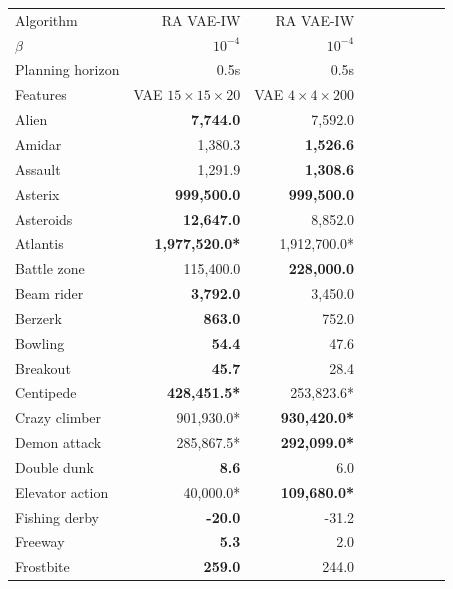 \begin{table}[ht]
\begin{center}
\begin{small}
\begin{tabular}{lrrrrrrrl}

\toprule
Algorithm& RA VAE-IW & RA VAE-IW \\
    $\beta$ & $10^{-4}$ & $10^{-4}$\\
Planning horizon&  0.5s & 0.5s \\
Features &   VAE $15 \times 15 \times 20$ &  VAE $4 \times 4 \times 200$ \\
\midrule
Alien           & \textbf{7,744.0}     & 7,592.0              \\
Amidar          & 1,380.3              & \textbf{1,526.6}     \\
Assault         & 1,291.9              & \textbf{1,308.6}     \\
Asterix         & \textbf{999,500.0}   & \textbf{999,500.0}   \\
Asteroids       & \textbf{12,647.0}    & 8,852.0              \\
Atlantis        & \textbf{1,977,520.0*} & 1,912,700.0*          \\
Battle zone     & 115,400.0            & \textbf{228,000.0}   \\
Beam rider      & \textbf{3,792.0}     & 3,450.0              \\
Berzerk         & \textbf{863.0}       & 752.0                \\
Bowling         & \textbf{54.4}        & 47.6                 \\
Breakout        & \textbf{45.7}        & 28.4                 \\
Centipede       & \textbf{428,451.5*}   & 253,823.6*            \\
Crazy climber   & 901,930.0*            & \textbf{930,420.0*}   \\
Demon attack    & 285,867.5*            & \textbf{292,099.0*}   \\
Double dunk     & \textbf{8.6}         & 6.0                  \\
Elevator action & 40,000.0*             & \textbf{109,680.0*}   \\
Fishing derby   & \textbf{-20.0}       & -31.2                \\
Freeway         & \textbf{5.3}         & 2.0                  \\
Frostbite       & \textbf{259.0}       & 244.0                \\

\end{tabular}
\end{small}
\end{center}
\end{table}
